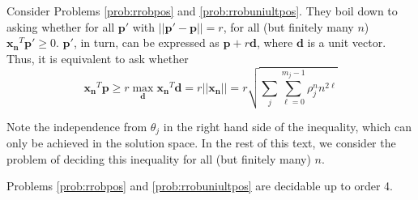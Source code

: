 Consider Problems \ref{prob:rrobpos} and \ref{prob:rrobuniultpos}. They boil down to asking whether for all $\mathbf{p'}$ with $||\mathbf{p'} - \mathbf{p}|| = r$, for all (but finitely many $n$) $\mathbf{x_n}^T\mathbf{p'} \ge 0$. $\mathbf{p'}$, in turn, can be expressed as $\mathbf{p} + r\mathbf{d}$, where $\mathbf{d}$ is a unit vector. Thus, it is equivalent to ask whether
\begin{equation}
\label{eq:crux}
\mathbf{x_n}^T\mathbf{p} \ge r\max_{\mathbf{d}}\mathbf{x_n}^T\mathbf{d} = r ||\mathbf{x_n}|| = r \sqrt{\sum_{j} \sum_{\ell=0}^{m_j-1} \rho_j^n n^{2\ell}}
\end{equation}

Note the independence from $\theta_j$ in the right hand side of the inequality, which can only be achieved in the solution space. In the rest of this text, we consider the problem of deciding this inequality for all (but finitely many) $n$.

\begin{theorem}
\label{thm:decide}
Problems \ref{prob:rrobpos} and \ref{prob:rrobuniultpos} are decidable up to order 4.
\end{theorem}


